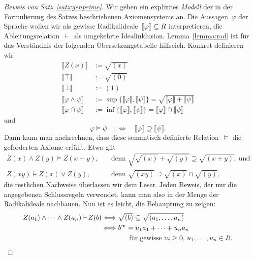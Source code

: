 \documentclass[a4paper,ngerman,12pt]{scrartcl}
\theoremstyle{definition}
\theoremstyle{plain}
\theoremstyle{remark}
\newcommand{\brak}[1]{\llbracket {#1} \rrbracket}
\newcommand{\seq}[1]{\mathrel{\vdash\!\!\!_{#1}}}
\renewcommand{\_}{\mathpunct{.}\,}
\newcommand{\?}{\,{:}\,}
\begin{document}
\begin{proof}[Beweis von Satz~\ref{satz:genprime}]
Wir geben ein explizites \emph{Modell} der in der Formulierung des Satzes
beschriebenen Axiomensystems an. Die Aussagen~$\varphi$ der Sprache wollen wir als
gewisse Radikalideale~$\brak{\varphi} \subseteq R$ interpretieren, die
Ableitungsrelation~$\seq{}$ als umgekehrte Idealinklusion.
Lemma~\ref{lemma:rad} ist für das Verständnis der folgenden Übersetzungstabelle
hilfreich. Konkret definieren wir
\begin{align*}
  \brak{Z(x)} &:= \sqrt{(x)} \\
  \brak{\top} &:= \sqrt{(0)} \\
  \brak{\bot} &:= (1) \\
  \brak{\varphi \wedge \psi} &:= \sup\{\brak{\varphi},\brak{\psi}\} = \sqrt{\brak{\varphi} + \brak{\psi}} \\
  \brak{\varphi \cap \psi} &:= \inf\{\brak{\varphi},\brak{\psi}\} = \brak{\varphi} \cap \brak{\psi}
\end{align*}
und
\[ \varphi \models \psi \quad:\Longleftrightarrow\quad
  \brak{\varphi} \supseteq \brak{\psi}. \]
Dann kann man nachrechnen, dass diese semantisch definierte Relation~$\models$
die geforderten Axiome erfüllt. Etwa gilt
\begin{align*}
  Z(x) \wedge Z(y) \models Z(x+y), &
    \quad\text{denn } \sqrt{\sqrt{(x)} + \sqrt{(y)}} \supseteq \sqrt{(x+y)},\ \text{und} \\
  Z(xy) \models Z(x) \vee Z(y), &
    \quad\text{denn } \sqrt{(xy)} \supseteq \sqrt{(x)} \cap \sqrt{(y)},
\end{align*}
die restlichen Nachweise überlassen wir dem Leser. Jeden Beweis, der nur die
angegebenen Schlussregeln verwendet, kann man also in der Menge der
Radikalideale nachbauen. Nun ist es leicht, die Behauptung zu zeigen:
\begin{align*}
  Z(a_1) \wedge \cdots \wedge Z(a_n) \seq{} Z(b)
  &\Longleftrightarrow
  \sqrt{(b)} \subseteq \sqrt{(a_1,\ldots,a_n)} \\
  &\Longleftrightarrow
  b^m = u_1 a_1 + \cdots + u_n a_n \\
  &\qquad\qquad
    \text{für gewisse~$m \geq 0$, $u_1,\ldots,u_n \in R$.} \qedhere
\end{align*}
\end{proof}

\end{document}
